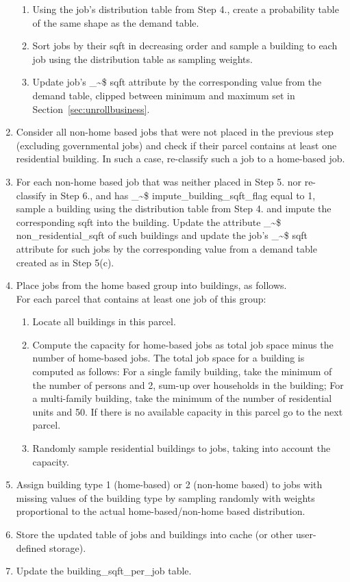 \documentclass[11pt]{article}
\makeatletter
\newcommand\code{\bgroup\@makeother\_\@makeother\~\@makeother\$\@codex}
\def\@codex#1{{\normalfont\ttfamily\hyphenchar\font=-1 #1}\egroup}
\makeatother
\begin{document}
\begin{enumerate}
\begin{enumerate}
	\item Using the job's distribution table from Step 4., create a probability table of the same shape as the demand table.
	\item Sort jobs by their sqft in decreasing order and sample a building to each job using the distribution table as sampling weights.
	\item Update job's \code{sqft} attribute by the corresponding value from the demand table, clipped between minimum and maximum set in Section~\ref{sec:unrollbusiness}.
	\end{enumerate}
\item Consider all non-home based jobs that were not placed in the previous step (excluding governmental jobs) and check if their parcel contains at least one residential building. In such a case, re-classify such a job to a home-based job.
\item For each non-home based job that was neither placed in Step 5.  nor re-classify in Step 6., and has \code{impute_building_sqft_flag} equal to 1, sample a building using the distribution table from Step 4. and impute the corresponding sqft into the building. Update the attribute \code{non_residential_sqft} of such buildings and update the job's \code{sqft} attribute for such jobs  by the corresponding value from a demand table created as in Step 5(c).
\item Place jobs from the home based group into buildings, as follows.\\
For each parcel that contains at least one job of this group:
	\begin{enumerate}
	\item Locate all buildings in this parcel. 
	\item Compute the capacity for home-based jobs as total job space minus the number of home-based jobs. The total job space for a building is computed as follows: For a single family building, take the minimum of the number of persons and 2, sum-up over households in the building; For a multi-family building, take the minimum of the number of residential units and 50. If there is no available capacity in this parcel go to the next parcel.
	\item Randomly sample residential buildings to jobs, taking into account the capacity.
	\end{enumerate}
\item Assign building type 1 (home-based) or 2 (non-home based) to jobs with missing values of the building type by sampling randomly with weights proportional to the actual home-based/non-home based distribution.
\item Store the updated table of jobs and buildings into cache (or other user-defined storage).
\item Update the building\_sqft\_per\_job table.
\end{enumerate}
\end{document}
